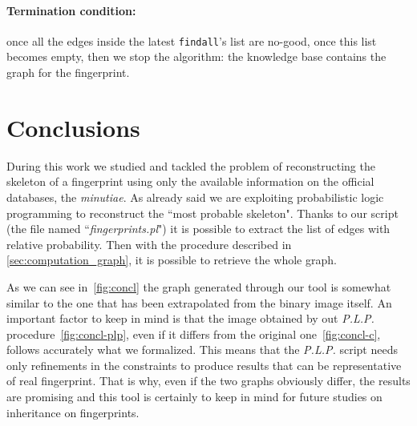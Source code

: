 \documentclass[8pt]{article}
\begin{document}
\paragraph{Termination condition:} once all the edges inside
the latest \texttt{findall}'s list are no-good, \ie once this list becomes empty,
then we stop the algorithm: the knowledge base contains the graph for the
fingerprint.

\section{Conclusions}
During this work we studied and tackled the problem of reconstructing the skeleton 
of a fingerprint using only the available information on the official databases, 
\ie the \emph{minutiae}.
As already said we are exploiting probabilistic logic programming to reconstruct the 
\textquotedblleft most probable skeleton".
Thanks to our script (the file named \textquotedblleft \textit{fingerprints.pl}") it 
is possible to extract the list of edges with relative probability. 
Then with the procedure described in \cref{sec:computation_graph},
it is possible to retrieve the whole graph.

As we can see in~\cref{fig:concl} the graph generated through our tool is somewhat similar 
to the one that has been extrapolated from the binary image itself.
An important factor to keep in mind is that the image obtained by out \textit{P.L.P.} procedure~\cref{fig:concl-plp}, even if it differs from the original one~\cref{fig:concl-c}, follows accurately what we formalized.
This means that the \textit{P.L.P.} script needs only refinements in the constraints to produce results that can be representative of real fingerprint.
That is why, even if the two graphs obviously differ, the results are promising and this tool is certainly 
to keep in mind for future studies on inheritance on fingerprints.
\end{document}

